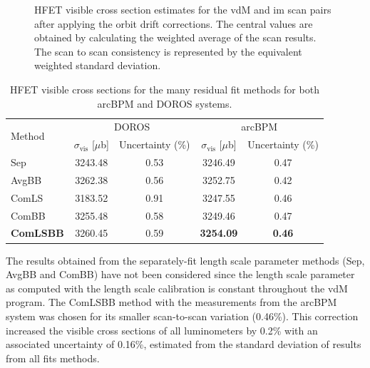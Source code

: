 \begin{figure}[!htb]
	\centering
	\caption[Comparison of residual orbit fit methods]{HFET visible cross section estimates for the vdM and im scan pairs after applying the orbit drift corrections. The central values are obtained by calculating the weighted average of the scan results. The scan to scan consistency is represented by the equivalent weighted standard deviation.}
	\label{fig:rod_xsec_methods_results}
\end{figure}

\begin{table}[!htb]
    \centering
    \caption{HFET visible cross sections for the many residual fit methods for both arcBPM and DOROS systems.}
    \label{tb:hfet_rod_xsec}
    \begin{tabular}{lcc|cc}
        \hline
        \multirow{2}{*}{Method} & \multicolumn{2}{c|}{DOROS} & \multicolumn{2}{c}{arcBPM} \\
        \cline{2-5}
         & $\sigma_{\mathrm{vis}}$ [$\mu$b] & Uncertainty (\%) & $\sigma_{\mathrm{vis}}$ [$\mu$b] & Uncertainty (\%) \\
        \hline
        Sep     & 3243.48 & 0.53 & 3246.49 & 0.47 \\
        AvgBB   & 3262.38 & 0.56 & 3252.75 & 0.42 \\
        ComLS   & 3183.52 & 0.91 & 3247.55 & 0.46 \\
        ComBB   & 3255.48 & 0.58 & 3249.46 & 0.47 \\
        \textbf{ComLSBB} & 3260.45 & 0.59 & \textbf{3254.09} & \textbf{0.46} \\
        \hline
    \end{tabular}
\end{table}


The results obtained from the separately-fit length scale parameter methods (Sep, AvgBB and ComBB) have not been considered since the length scale parameter as computed with the length scale calibration is constant throughout the vdM program. The ComLSBB method with the measurements from the arcBPM system was chosen for its smaller scan-to-scan variation (0.46\%). This correction increased the visible cross sections of all luminometers by 0.2\% with an associated uncertainty of 0.16\%, estimated from the standard deviation of results from all fits methods.

